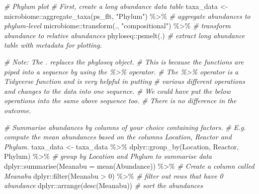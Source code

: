 \documentclass[
]{book}
\newenvironment{Shaded}{\begin{snugshade}}{\end{snugshade}}
\newcommand{\AttributeTok}[1]{\textcolor[rgb]{0.77,0.63,0.00}{#1}}
\newcommand{\CommentTok}[1]{\textcolor[rgb]{0.56,0.35,0.01}{\textit{#1}}}
\newcommand{\DecValTok}[1]{\textcolor[rgb]{0.00,0.00,0.81}{#1}}
\newcommand{\FunctionTok}[1]{\textcolor[rgb]{0.00,0.00,0.00}{#1}}
\newcommand{\NormalTok}[1]{#1}
\newcommand{\OtherTok}[1]{\textcolor[rgb]{0.56,0.35,0.01}{#1}}
\newcommand{\SpecialCharTok}[1]{\textcolor[rgb]{0.00,0.00,0.00}{#1}}
\newcommand{\StringTok}[1]{\textcolor[rgb]{0.31,0.60,0.02}{#1}}
\begin{document}
\begin{Shaded}
\begin{Highlighting}[]
\CommentTok{\# Phylum plot  }
\CommentTok{\# First, create a long abundance data table  }
\NormalTok{taxa\_data }\OtherTok{\textless{}{-}}\NormalTok{  microbiome}\SpecialCharTok{::}\FunctionTok{aggregate\_taxa}\NormalTok{(ps\_flt, }\StringTok{"Phylum"}\NormalTok{) }\SpecialCharTok{\%\textgreater{}\%}   
  \CommentTok{\# aggregate abundances to phylum{-}level}
\NormalTok{  microbiome}\SpecialCharTok{::}\FunctionTok{transform}\NormalTok{(., }\StringTok{"compositional"}\NormalTok{) }\SpecialCharTok{\%\textgreater{}\%}  \CommentTok{\# transform abundance to relative abundances}
\NormalTok{  phyloseq}\SpecialCharTok{::}\FunctionTok{psmelt}\NormalTok{(.)  }\CommentTok{\# extract long abundance table with metadata for plotting. }

\CommentTok{\# Note: The \textasciigrave{}.\textasciigrave{} replaces the phyloseq object. }
\CommentTok{\# This is because the functions are piped into a sequence by using the \textasciigrave{}\%\textgreater{}\%\textasciigrave{} operator. }
\CommentTok{\# The \textasciigrave{}\%\textgreater{}\%\textasciigrave{} operator is a Tidyverse function and is very helpful in putting }
\CommentTok{\# various different operations and changes to the data into one sequence. }
\CommentTok{\# We could have put the below operations into the same above sequence too.}
\CommentTok{\# There is no difference in the outcome.}

\CommentTok{\# Summarise abundances by columns of your choice containing factors.}
\CommentTok{\# E.g. compute the mean abundances based on the columns \textasciigrave{}Location\textasciigrave{}, \textasciigrave{}Reactor\textasciigrave{} and \textasciigrave{}Phylum.   }
\NormalTok{taxa\_data }\OtherTok{\textless{}{-}}\NormalTok{ taxa\_data }\SpecialCharTok{\%\textgreater{}\%}
\NormalTok{    dplyr}\SpecialCharTok{::}\FunctionTok{group\_by}\NormalTok{(Location, Reactor, Phylum) }\SpecialCharTok{\%\textgreater{}\%}  \CommentTok{\# group by Location and Phylum to summarise data}
\NormalTok{    dplyr}\SpecialCharTok{::}\FunctionTok{summarise}\NormalTok{(}\AttributeTok{Meanabu =} \FunctionTok{mean}\NormalTok{(Abundance)) }\SpecialCharTok{\%\textgreater{}\%}  \CommentTok{\# Create a column called \textasciigrave{}Meanabu\textasciigrave{}}
\NormalTok{    dplyr}\SpecialCharTok{::}\FunctionTok{filter}\NormalTok{(Meanabu }\SpecialCharTok{\textgreater{}} \DecValTok{0}\NormalTok{) }\SpecialCharTok{\%\textgreater{}\%}                  \CommentTok{\# filter out rows that have 0 abundance}
\NormalTok{    dplyr}\SpecialCharTok{::}\FunctionTok{arrange}\NormalTok{(}\FunctionTok{desc}\NormalTok{(Meanabu)) }\CommentTok{\# sort the abundances }


\end{Highlighting}
\end{Shaded}
\end{document}
